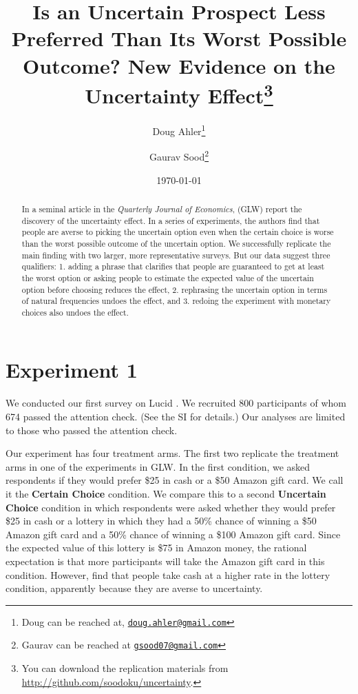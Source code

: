 \documentclass[12pt, letterpaper]{article}
\title{Is an Uncertain Prospect Less Preferred Than Its Worst Possible Outcome? New Evidence on the Uncertainty Effect\thanks{You can download the replication materials from \href{http://github.com/soodoku/uncertainty}{http://github.com/soodoku/uncertainty}.}}
\author{Doug Ahler\thanks{Doug can be reached at, \href{mailto:doug.ahler@gmail.com}{\footnotesize{\texttt{doug.ahler@gmail.com}}}} \and Gaurav Sood\thanks{Gaurav can be reached at \href{mailto:gsood07@gmail.com}{\footnotesize{\texttt{gsood07@gmail.com}}}}}
\date{\today}
\begin{document}
\maketitle

\thispagestyle{empty}
\begin{abstract}
\noindent In a seminal article in the \textit{Quarterly Journal of Economics}, \cite{gneezy2006uncertainty} (GLW) report the discovery of the uncertainty effect. In a series of experiments, the authors find that people are averse to picking the uncertain option even when the certain choice is worse than the worst possible outcome of the uncertain option. We successfully replicate the main finding with two larger, more representative surveys. But our data suggest three qualifiers: 1. adding a phrase that clarifies that people are guaranteed to get at least the worst option or asking people to estimate the expected value of the uncertain option before choosing reduces the effect, 2. rephrasing the uncertain option in terms of natural frequencies undoes the effect, and 3. redoing the experiment with monetary choices also undoes the effect.
\end{abstract} 
\clearpage
\setcounter{page}{1}
\doublespace

\section*{Experiment 1}

We conducted our first survey on Lucid \citep{coppock2019validating}. We recruited 800 participants of whom 674 passed the attention check. (See the SI for details.) Our analyses are limited to those who passed the attention check.

Our experiment has four treatment arms. The first two replicate the treatment arms in one of the experiments in GLW. In the first condition, we asked respondents if they would prefer \$25 in cash or a \$50 Amazon gift card. We call it the \textbf{Certain Choice} condition. We compare this to a second \textbf{Uncertain Choice} condition in which respondents were asked whether they would prefer \$25 in cash or a lottery in which they had a 50\% chance of winning a \$50 Amazon gift card and a 50\% chance of winning a \$100 Amazon gift card. Since the expected value of this lottery is \$75 in Amazon money, the rational expectation is that more participants will take the Amazon gift card in this condition. However, \cite{gneezy2006uncertainty} find that people take cash at a higher rate in the lottery condition, apparently because they are averse to uncertainty.
\end{document}
